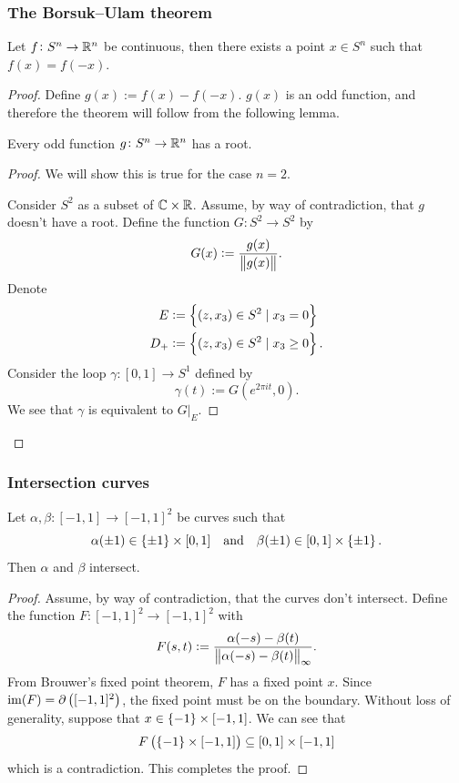\documentclass[11pt,a4paper]{article}
\begin{document}
\subsubsection{The Borsuk--Ulam theorem}
\begin{theorem}
  Let $f \colon S^n \to \mathbb{R}^n$ be continuous, then there exists a point
  $x \in S^n$ such that $f(x) = f(-x)$.
\end{theorem}
\begin{proof}
  Define $g(x) := f(x) - f(-x)$.
  $g(x)$ is an odd function, and therefore the theorem will follow from the
  following lemma.
  \begin{lemma}
    \label{lem:borsuk-ulam}
    Every odd function $g \colon S^n \to \mathbb{R}^n$ has a root.
  \end{lemma}
  \begin{proof}
    We will show this is true for the case $n = 2$.

    Consider $S^2$ as a subset of $\mathbb{C} \times \mathbb{R}$.
    Assume, by way of contradiction, that $g$ doesn't have a root.
    Define the function $G \colon S^2 \to S^2$ by
    \[
      G(x) := \frac{g(x)}{\left\lVert g(x)\right\rVert}.
    \]
    Denote
    \begin{align*}
      E &:= \left\{(z,x_3) \in S^2 \mid x_3 = 0\right\} \\
      D_{+} &:= \left\{(z,x_3) \in S^2 \mid x_3 \geq 0\right\}.
    \end{align*}
    Consider the loop $\gamma \colon [0,1] \to S^1$ defined by
    \[
      \gamma(t) := G(e^{2 \pi i t}, 0).
    \]
    We see that $\gamma$ is equivalent to $G \vert_E$.
  \end{proof}
\end{proof}

\subsubsection{Intersection curves}
\begin{theorem}
  Let $\alpha, \beta \colon [-1,1] \to [-1,1]^2$ be curves such that
  \[
    \alpha(\pm 1) \in \left\{\pm 1\right\} \times [0,1] \quad \text{and} \quad
    \beta(\pm 1) \in [0,1] \times \left\{\pm 1\right\}.
  \]
  Then $\alpha$ and $\beta$ intersect.
\end{theorem}
\begin{proof}
  Assume, by way of contradiction, that the curves don't intersect.
  Define the function $F \colon [-1,1]^2 \to [-1,1]^2$ with
  \[
    F(s,t) :=
    \frac{\alpha(-s) - \beta(t)}{\left\lVert\alpha(-s) - \beta(t)\right\rVert_{\infty}}.
  \]
  From Brouwer's fixed point theorem, $F$ has a fixed point $x$.
  Since $\im(F) = \partial\del{[-1,1]^2}$, the fixed point must be
  on the boundary.
  Without loss of generality, suppose that $x \in \left\{-1\right\} \times [-1,1]$.
  We can see that
  \[
    F\del{\set{-1} \times [-1,1]} \subseteq [0,1] \times [-1,1]
  \]
  which is a contradiction.
  This completes the proof.
\end{proof}
\end{document}
